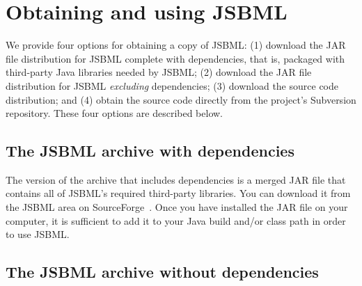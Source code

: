 
\section{Obtaining and using JSBML}
\label{sec:obtaining-jsbml}

We provide four options for obtaining a copy of JSBML: (1) download the JAR
file distribution for JSBML complete with dependencies, that is, packaged
with third-party Java libraries needed by JSBML; (2) download the JAR file
distribution for JSBML \emph{excluding} dependencies; (3) download the
source code distribution; and (4) obtain the source code directly from the
project's Subversion repository. These four options are described below.


\subsection{The JSBML archive with dependencies}

The version of the archive that includes dependencies is a merged JAR file
that contains all of JSBML's required third-party libraries. You can
download it from the JSBML area on SourceForge~\cite{JSBMLdownload}. Once
you have installed the JAR file on your computer, it is sufficient to add
it to your Java build and/or class path in order to use JSBML.


\subsection{The JSBML archive without dependencies}

